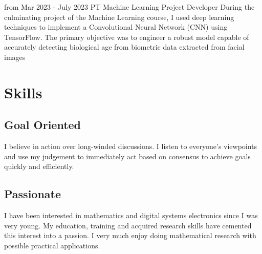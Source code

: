 \documentclass[10pt]{curriculum}
\begin{document}
\begin{paracol}{2}
\jobentry
	{from Mar 2023 - July 2023} %
	{PT} %
	{}
	{Machine Learning Project Developer}
	{During the culminating project of the Machine Learning course, I used deep learning techniques to implement a Convolutional Neural Network (CNN) using TensorFlow. The primary objective was to engineer a robust model capable of accurately detecting biological age from biometric data extracted from facial images}


\section{Skills}

\subsection{Goal Oriented}

I believe in action over long-winded discussions. I listen to everyone's viewpoints and use my judgement to immediately act based on consensus to achieve goals quickly and efficiently.

\subsection{Passionate}
I have been interested in mathematics and digital systems electronics since I was very young. My education, training and acquired research skills have cemented this interest into a passion. I very much enjoy doing mathematical research with possible practical applications.




\switchcolumn %



\end{paracol}
\end{document}
